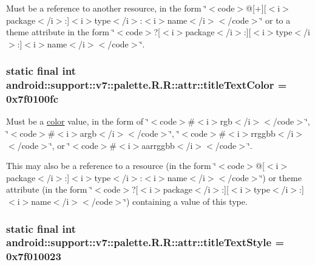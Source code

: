 Must be a reference to another resource, in the form \char`\"{}$<$code$>$@\mbox{[}+\mbox{]}\mbox{[}$<$i$>$package$<$/i$>$:\mbox{]}$<$i$>$type$<$/i$>$:$<$i$>$name$<$/i$>$$<$/code$>$\char`\"{} or to a theme attribute in the form \char`\"{}$<$code$>$?\mbox{[}$<$i$>$package$<$/i$>$:\mbox{]}\mbox{[}$<$i$>$type$<$/i$>$:\mbox{]}$<$i$>$name$<$/i$>$$<$/code$>$\char`\"{}. \hypertarget{classandroid_1_1support_1_1v7_1_1palette_1_1_r_1_1attr_cf3b86608c6a3cf645990abf679d8c2a}{
\subsubsection[{titleTextColor}]{\setlength{\rightskip}{0pt plus 5cm}static final int android::support::v7::palette.R.R::attr::titleTextColor = 0x7f0100fc}}
\label{classandroid_1_1support_1_1v7_1_1palette_1_1_r_1_1attr_cf3b86608c6a3cf645990abf679d8c2a}


Must be a \hyperlink{classandroid_1_1support_1_1v7_1_1palette_1_1_r_1_1color}{color} value, in the form of \char`\"{}$<$code$>$\#$<$i$>$rgb$<$/i$>$$<$/code$>$\char`\"{}, \char`\"{}$<$code$>$\#$<$i$>$argb$<$/i$>$$<$/code$>$\char`\"{}, \char`\"{}$<$code$>$\#$<$i$>$rrggbb$<$/i$>$$<$/code$>$\char`\"{}, or \char`\"{}$<$code$>$\#$<$i$>$aarrggbb$<$/i$>$$<$/code$>$\char`\"{}. 

This may also be a reference to a resource (in the form \char`\"{}$<$code$>$@\mbox{[}$<$i$>$package$<$/i$>$:\mbox{]}$<$i$>$type$<$/i$>$:$<$i$>$name$<$/i$>$$<$/code$>$\char`\"{}) or theme attribute (in the form \char`\"{}$<$code$>$?\mbox{[}$<$i$>$package$<$/i$>$:\mbox{]}\mbox{[}$<$i$>$type$<$/i$>$:\mbox{]}$<$i$>$name$<$/i$>$$<$/code$>$\char`\"{}) containing a value of this type. \hypertarget{classandroid_1_1support_1_1v7_1_1palette_1_1_r_1_1attr_b8e1307bcb1b555e87a01d90cf492a1d}{
\subsubsection[{titleTextStyle}]{\setlength{\rightskip}{0pt plus 5cm}static final int android::support::v7::palette.R.R::attr::titleTextStyle = 0x7f010023}}
\label{classandroid_1_1support_1_1v7_1_1palette_1_1_r_1_1attr_b8e1307bcb1b555e87a01d90cf492a1d}


